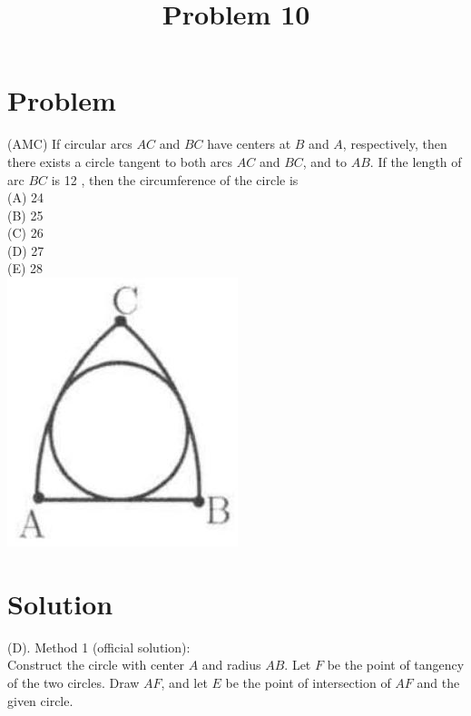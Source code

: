 \documentclass{article}
\title{Problem 10}
\date{}
\begin{document}
\maketitle

\section*{Problem}
(AMC) If circular arcs \(A C\) and \(B C\) have centers at \(B\) and \(A\), respectively, then there exists a circle tangent to both arcs \(A C\) and \(B C\), and to \(A B\). If the length of arc \(B C\) is 12 , then the circumference of the circle is\\
(A) 24\\
(B) 25\\
(C) 26\\
(D) 27\\
(E) 28\\
\centering
\includegraphics[width=\textwidth]{images/208.jpg}

\section*{Solution}
(D).
Method 1 (official solution):\\
Construct the circle with center \(A\) and radius \(A B\). Let \(F\) be the point of tangency of the two circles. Draw \(A F\), and let \(E\) be the point of intersection of \(A F\) and the given circle.
\end{document}
